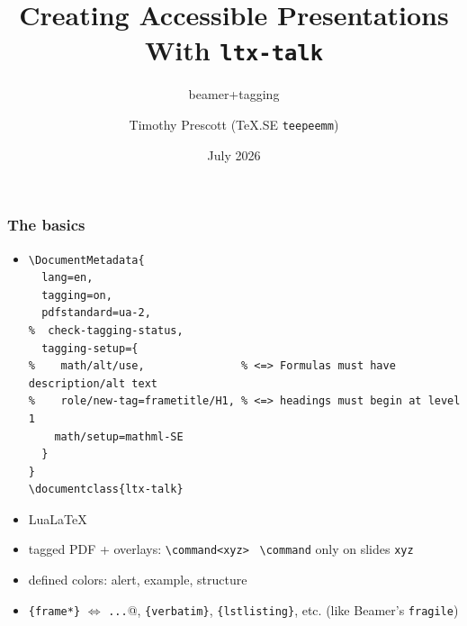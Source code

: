 \documentclass{ltx-talk}
\date{July 2026}
\title[Accessible Presentations]
 {Creating Accessible Presentations With \texttt{ltx-talk}}
\subtitle{beamer+tagging}
\author[Tim Prescott]{Timothy Prescott (\TeX.SE \texttt{teepeemm})}
\institute{University of North Dakota}
\newcommand{\cs}[1]{\texttt{\textbackslash #1}}
\newcommand{\tubbraced}[1]{\texttt{\{#1\}}}
\begin{document}

\begin{frame}
\maketitle[
  element-order = {title, author, titlegraphic, date},
  framestyle = plain,
]
\end{frame}

\begin{frame*}
\frametitle{The basics}
\begin{itemize}
\item
\begin{lstlisting}
\DocumentMetadata{
  lang=en,
  tagging=on,
  pdfstandard=ua-2,
%  check-tagging-status,
  tagging-setup={
%    math/alt/use,               % <=> Formulas must have description/alt text
%    role/new-tag=frametitle/H1, % <=> headings must begin at level 1
    math/setup=mathml-SE
  }
}
\documentclass{ltx-talk}
\end{lstlisting}
\item Lua\LaTeX
\item tagged PDF + overlays: \verb|\command<xyz>| \textrightarrow\ \cs{command} only on slides \verb|xyz|
\item defined colors: \textcolor{alert}{alert}, \textcolor{example}{example}, \textcolor{structure}{structure}
\item \tubbraced{frame*} $\Leftrightarrow$ \verb@\verb|...|@,
\tubbraced{verbatim}, \tubbraced{lstlisting}, etc. (like Beamer's \texttt{fragile})
\end{itemize}
\end{frame*}
\end{document}
